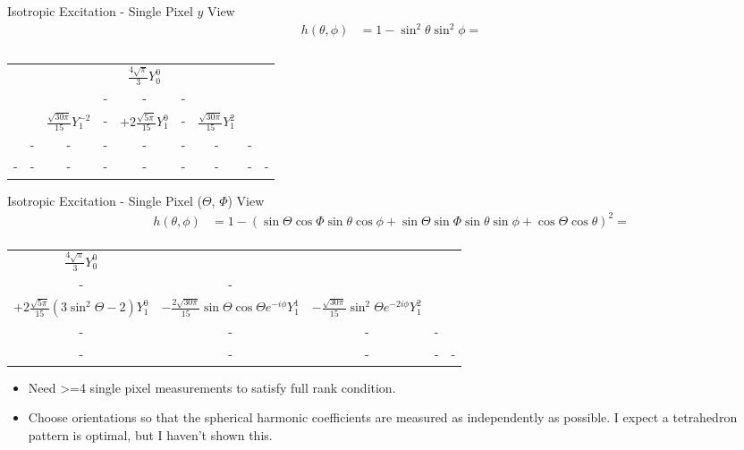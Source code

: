 \documentclass[presentation]{beamer}
\begin{document}
\begin{frame}[label=sec-7]{Isotropic Excitation - Single Pixel $y$ View}
\begin{align*}
h(\theta, \phi) &= 1 - \sin^2\theta\sin^2\phi= \\ \\
\end{align*}
\begin{center}
\begin{tabular}{ccccccccc} 
&&&&$\frac{4\sqrt{\pi}}{3}Y_0^0$&&&&\\
&&&-&-&-&&&\\
&&$\frac{\sqrt{30\pi}}{15}Y_1^{-2}$&-&$+2\frac{\sqrt{5\pi}}{15}Y_1^0$&-&$\frac{\sqrt{30\pi}}{15}Y_1^2$&&\\
&-&-&-&-&-&-&-&\\
-&-&-&-&-&-&-&-&-\\
\end{tabular}
\end{center}
\end{frame}
\begin{frame}[label=sec-8]{Isotropic Excitation - Single Pixel ($\Theta$, $\Phi$) View}
\small
\begin{align*}
h(\theta, \phi) &= 1 - (\sin\Theta\cos\Phi\sin\theta\cos\phi + \sin\Theta\sin\Phi\sin\theta\sin\phi + \cos\Theta\cos\theta)^2= \\
\end{align*}
\footnotesize
\begin{center}
\begin{tabular}{ccccc} 
$\frac{4\sqrt{\pi}}{3}Y_0^0$&&&&\\
-&-&&&\\
$+2\frac{\sqrt{5\pi}}{15}(3\sin^2\Theta - 2)Y_1^0$&$-\frac{2\sqrt{30\pi}}{15}\sin\Theta\cos\Theta e^{-i\phi} Y_1^{1}$&$-\frac{\sqrt{30\pi}}{15}\sin^2\Theta e^{-2i\phi} Y_1^{2}$&&\\
-&-&-&-&\\
-&-&-&-&-\\
\end{tabular}
\end{center}
\begin{itemize}
\item Need >=4 single pixel measurements to satisfy full rank condition. 
\item Choose orientations so that the spherical harmonic coefficients are measured as independently as possible. I expect a tetrahedron pattern is optimal, but I haven't shown this. 
\end{itemize}
\end{frame}
\end{document}
